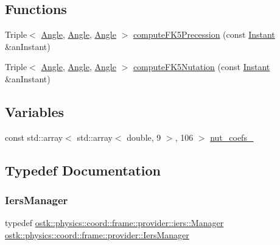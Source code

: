 \subsection*{Functions}
\begin{DoxyCompactItemize}
\item 
Triple$<$ \hyperlink{classostk_1_1physics_1_1units_1_1_angle}{Angle}, \hyperlink{classostk_1_1physics_1_1units_1_1_angle}{Angle}, \hyperlink{classostk_1_1physics_1_1units_1_1_angle}{Angle} $>$ \hyperlink{namespaceostk_1_1physics_1_1coord_1_1frame_1_1provider_acd9c9770d79be89d7c94517df77ebe27}{compute\+F\+K5\+Precession} (const \hyperlink{classostk_1_1physics_1_1time_1_1_instant}{Instant} \&an\+Instant)
\item 
Triple$<$ \hyperlink{classostk_1_1physics_1_1units_1_1_angle}{Angle}, \hyperlink{classostk_1_1physics_1_1units_1_1_angle}{Angle}, \hyperlink{classostk_1_1physics_1_1units_1_1_angle}{Angle} $>$ \hyperlink{namespaceostk_1_1physics_1_1coord_1_1frame_1_1provider_a0766714124629840ab0b3a909bc6e473}{compute\+F\+K5\+Nutation} (const \hyperlink{classostk_1_1physics_1_1time_1_1_instant}{Instant} \&an\+Instant)
\end{DoxyCompactItemize}
\subsection*{Variables}
\begin{DoxyCompactItemize}
\item 
const std\+::array$<$ std\+::array$<$ double, 9 $>$, 106 $>$ \hyperlink{namespaceostk_1_1physics_1_1coord_1_1frame_1_1provider_a73bcae3137799317545b837aa5693632}{nut\+\_\+coefs\+\_}
\end{DoxyCompactItemize}


\subsection{Typedef Documentation}
\mbox{\label{namespaceostk_1_1physics_1_1coord_1_1frame_1_1provider_a4a4183a2547e2e41d722a832c7e1c137}} 
\subsubsection{\texorpdfstring{Iers\+Manager}{IersManager}}
{\footnotesize\ttfamily typedef \hyperlink{classostk_1_1physics_1_1coord_1_1frame_1_1provider_1_1iers_1_1_manager}{ostk\+::physics\+::coord\+::frame\+::provider\+::iers\+::\+Manager} \hyperlink{namespaceostk_1_1physics_1_1coord_1_1frame_1_1provider_a4a4183a2547e2e41d722a832c7e1c137}{ostk\+::physics\+::coord\+::frame\+::provider\+::\+Iers\+Manager}}




